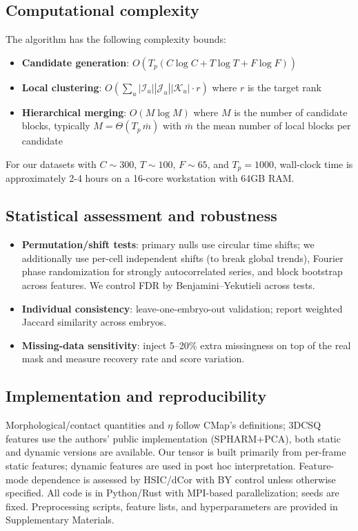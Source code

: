 \documentclass[unnumsec,webpdf,modern,large,namedate]{oup-authoring-template}%
\theoremstyle{thmstyleone}\newtheorem{theorem}{Theorem}
\theoremstyle{thmstyletwo}\newtheorem{example}{Example}
\theoremstyle{thmstylethree}\newtheorem{definition}{Definition}
\begin{document}
\subsection{Computational complexity}

The algorithm has the following complexity bounds:
\begin{itemize}
\item \textbf{Candidate generation}: $O(T_p(C\log C + T\log T + F\log F))$ 
\item \textbf{Local clustering}: $O(\sum_u |\mathcal{I}_u||\mathcal{J}_u||\mathcal{K}_u| \cdot r)$ where $r$ is the target rank
\item \textbf{Hierarchical merging}: $O(M\log M)$ where $M$ is the number of candidate blocks, typically $M = \Theta(T_p\, \bar m)$ with $\bar m$ the mean number of local blocks per candidate
\end{itemize}

For our datasets with $C \sim 300$, $T \sim 100$, $F \sim 65$, and $T_p = 1000$, wall-clock time is approximately 2-4 hours on a 16-core workstation with 64GB RAM.

\subsection{Statistical assessment and robustness}
\begin{itemize}
    \item \textbf{Permutation/shift tests}: primary nulls use circular time shifts; we additionally use per-cell independent shifts (to break global trends), Fourier phase randomization for strongly autocorrelated series, and block bootstrap across features. We control FDR by Benjamini--Yekutieli across tests.
    \item \textbf{Individual consistency}: leave-one-embryo-out validation; report weighted Jaccard similarity across embryos.
    \item \textbf{Missing-data sensitivity}: inject 5--20\% extra missingness on top of the real mask and measure recovery rate and score variation.
\end{itemize}

\subsection{Implementation and reproducibility}
Morphological/contact quantities and $\eta$ follow CMap's definitions; 3DCSQ features use the authors' public implementation (SPHARM+PCA), both static and dynamic versions are available. Our tensor is built primarily from per-frame static features; dynamic features are used in post hoc interpretation. Feature-mode dependence is assessed by HSIC/dCor with BY control unless otherwise specified. All code is in Python/Rust with MPI-based parallelization; seeds are fixed. Preprocessing scripts, feature lists, and hyperparameters are provided in Supplementary Materials.
\end{document}
